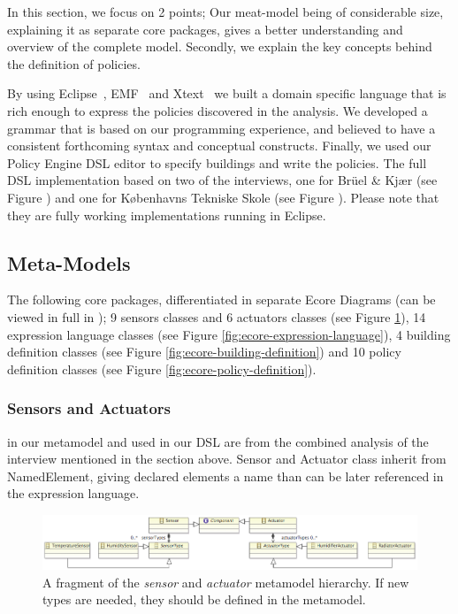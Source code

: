 In this section, we focus on 2 points; Our meat-model being of considerable size, explaining it as separate core packages, gives a better understanding and overview of the complete model. Secondly, we explain the key concepts behind the definition of policies.
 
By using Eclipse~\cite{eclipse}, EMF~\cite{emf} and Xtext~\cite{xtext} we built a domain specific language that is rich enough to express the policies discovered in the analysis. We developed a grammar that is based on our programming experience, and believed to have a consistent forthcoming syntax and conceptual constructs. Finally, we used our Policy Engine DSL editor to specify buildings and write the policies. The full DSL implementation based on two of the interviews, one for Br\"{u}el \& Kj\ae r (see Figure ) and one for K\o benhavns Tekniske Skole (see Figure ). Please note that they are fully working implementations running in Eclipse.

\subsection{Meta-Models}

The following core packages, differentiated in separate Ecore Diagrams (can be viewed in full in ); 9 sensors classes and 6 actuators classes (see Figure \ref{fig:ecore-sensors-actuators}), 14 expression language classes (see Figure \ref{fig:ecore-expression-language}), 4 building definition classes (see Figure \ref{fig:ecore-building-definition}) and 10 policy definition classes (see Figure \ref{fig:ecore-policy-definition}).

\subsubsection{Sensors and Actuators}
in our metamodel and used in our DSL are from the combined analysis of the interview mentioned in the section above. Sensor and Actuator class inherit from NamedElement, giving declared elements a name than can be later referenced in the expression language.
\begin{figure}[h]
	\centering
    \includegraphics[scale=0.37]{ecore-sensors-actuators.png} 
	\caption{A fragment of the \textit{sensor} and \textit{actuator} metamodel hierarchy. If new types are needed, they should be defined in the metamodel.}
	\label{fig:ecore-sensors-actuators}
\end{figure}

